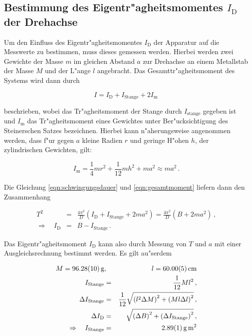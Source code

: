 	\subsection{Bestimmung des Eigentr"agheitsmomentes $I_\mathrm{D}$ der Drehachse}
	\label{subsec:eigentraegheitsmoment}
		Um den Einfluss des Eigentr"agheitsmomentes $I_\mathrm{D}$ der Apparatur auf die Messwerte zu bestimmen, muss dieses gemessen werden.
		Hierbei werden zwei Gewichte der Masse $m$ im gleichen Abstand $a$ zur Drehachse an einem Metallstab der Masse $M$ und der L"ange $l$ angebracht.
		Das Gesamttr"agheitsmoment des Systems wird dann durch

		\begin{equation}
			I = I_\mathrm{D} + I_\mathrm{Stange} + 2 I_\mathrm{m} \, \label{eqn:gesamtmoment}
		\end{equation}

		beschrieben, wobei das Tr"agheitsmoment der Stange durch $I_\mathrm{stange}$ gegeben ist und $I_\mathrm{m}$ das Tr"agheitsmoment eines Gewichtes unter Ber"ucksichtigung des Steinerschen Satzes bezeichnen.
		Hierbei kann n"aherungsweise angenommen werden, dass f"ur gegen $a$ kleine Radien $r$ und geringe H"ohen $h$, der zylindrischen Gewichten, gilt:

		\begin{equation*}
			I_\mathrm{m} = \frac{1}{4}mr^2 + \frac{1}{12}mh^2 + ma^2 \approx ma^2 \,.
		\end{equation*}

		Die Gleichung \eqref{eqn:schwingungsdauer} und \eqref{eqn:gesamtmoment} liefern dann den Zusammenhang

		\begin{eqnarray*}
			T^2 & = & \frac{4 \pi^2}{D} \left(I_\mathrm{D} + I_\mathrm{Stange} + 2ma^2 \right) = \frac{4 \pi^2}{D} \left(B  + 2ma^2 \right) \,, \\
			\Rightarrow \quad I_\mathrm{D} & = & B - I_\mathrm{Stange} \,.
		\end{eqnarray*}

		Das Eigentr"agheitsmoment $I_\mathrm{D}$ kann also durch Messung von $T$ und $a$ mit einer Ausgleichsrechnung bestimmt werden. Es gilt au"serdem

		\begin{eqnarray*}
			M = \SI{96.28 (10)}{\gram} &,& l = \SI{60.00 (5)}{\centi \meter} \\
			I_\mathrm{Stange} & = & \frac{1}{12} M l^2\,, \\
			\Delta I_\mathrm{Stange} & = & \frac{1}{12}\sqrt{ \left(l^2 \Delta M\right)^2 +\left(Ml \Delta l \right)^2} \,, \\
			\Delta I_\mathrm{D} & = & \sqrt{\left(\Delta B\right)^2 + \left(\Delta I_\mathrm{Stange}\right)^2} \,, \\
			\Rightarrow \quad I_\mathrm{Stange} & = & \SI{2.89 (1)}{\gram \meter \squared} 
		\end{eqnarray*}

